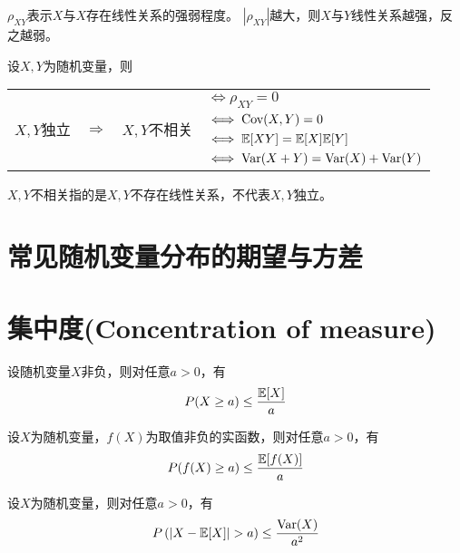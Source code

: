 \begin{remark}
  $\rho_{XY}$表示$X$与$X$存在线性关系的强弱程度。
  $|\rho_{XY}|$越大，则$X$与$Y$线性关系越强，反之越弱。
\end{remark}

\begin{theorem}[独立与不相关]
  设$X,Y$为随机变量，则
  \begin{center}
    \begin{tabular}{cccl}
      \multirow{4}{*}{$X,Y$独立} &
      \multirow{4}{*}{$\Longrightarrow$} &
      \multirow{4}{*}{$X,Y$不相关} &
      $\iff \rho_{XY}=0$ \\ 
      & & & $\iff \textrm{Cov}(X,Y)=0$ \\ 
      & & & $\iff \mathbb{E}[XY]=\mathbb{E}[X]\mathbb{E}[Y]$ \\ 
      & & & $\iff \textrm{Var}(X+Y)=\textrm{Var}(X)+\textrm{Var}(Y)$ \\ 
    \end{tabular} 
  \end{center}
\end{theorem}

\begin{remark}
  $X,Y$不相关指的是$X,Y$不存在线性关系，不代表$X,Y$独立。
\end{remark}

\section{常见随机变量分布的期望与方差}

\section{集中度(Concentration of measure)}

\begin{theorem}[马尔科夫不等式]
  设随机变量$X$非负，则对任意$a>0$，有
  \begin{displaymath}
    P(X\ge a) \le \frac{\mathbb{E}[X]}{a}
  \end{displaymath}
\end{theorem}

\begin{theorem}[马尔科夫不等式的推广]
  设$X$为随机变量，$f(X)$为取值非负的实函数，则对任意$a>0$，有
  \begin{displaymath}
    P(f(X)\ge a) \le \frac{\mathbb{E}[f(X)]}{a}
  \end{displaymath}
\end{theorem}

\begin{theorem}[切比雪夫不等式]
  设$X$为随机变量，则对任意$a>0$，有
  \begin{displaymath}
    P\left(|X-\mexpect[X]|>a\right) \le \frac{\mvar(X)}{a^2}
  \end{displaymath}
\end{theorem}